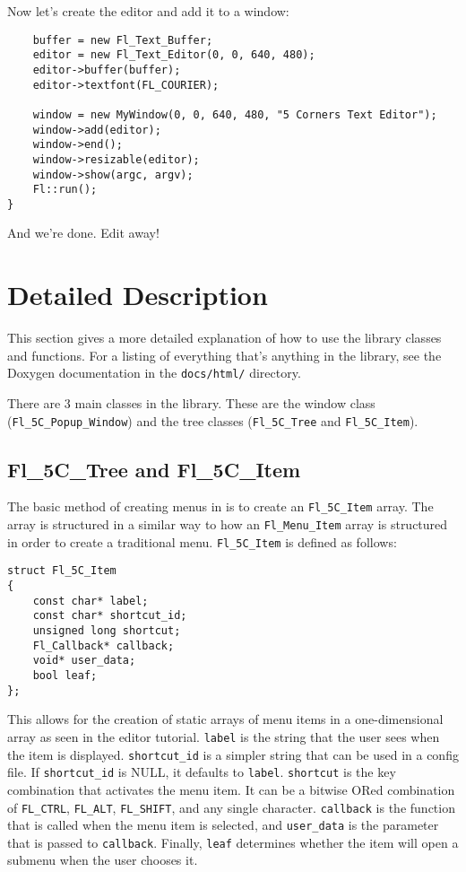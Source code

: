 Now let's create the editor and add it to a window:

\begin{samepage}
\begin{verbatim}
    buffer = new Fl_Text_Buffer;
    editor = new Fl_Text_Editor(0, 0, 640, 480);
    editor->buffer(buffer);
    editor->textfont(FL_COURIER);

    window = new MyWindow(0, 0, 640, 480, "5 Corners Text Editor");
    window->add(editor);
    window->end();
    window->resizable(editor);
    window->show(argc, argv);
    Fl::run();
}
\end{verbatim}
\end{samepage}

And we're done.  Edit away!

\section{Detailed Description}

This section gives a more detailed explanation of how to use the \fc{} library
classes and functions.  For a listing of everything that's anything in the
library, see the Doxygen documentation in the \texttt{docs/html/} directory.

There are 3 main classes in the library.  These are the window class
(\texttt{Fl\_5C\_Popup\_Window}) and the tree classes (\texttt{Fl\_5C\_Tree}
and \texttt{Fl\_5C\_Item}).

\subsection{Fl\_5C\_Tree and Fl\_5C\_Item}

The basic method of creating menus in \fc{} is to create an
\texttt{Fl\_5C\_Item} array.  The array is structured in a similar way to how
an \texttt{Fl\_Menu\_Item} array is structured in order to create a
traditional menu.  \texttt{Fl\_5C\_Item} is defined as follows:

\begin{samepage}
\begin{verbatim}
struct Fl_5C_Item
{
    const char* label;
    const char* shortcut_id;
    unsigned long shortcut;
    Fl_Callback* callback;
    void* user_data;
    bool leaf;
};
\end{verbatim}
\end{samepage}

This allows for the creation of static arrays of menu items in a
one-dimensional array as seen in the editor tutorial.  \texttt{label} is the
string that the user sees when the item is displayed.  \texttt{shortcut\_id}
is a simpler string that can be used in a config file.  If
\texttt{shortcut\_id} is NULL, it defaults to \texttt{label}.
\texttt{shortcut} is the key combination that activates the menu item.  It can
be a bitwise ORed combination of \texttt{FL\_CTRL}, \texttt{FL\_ALT},
\texttt{FL\_SHIFT}, and any single character.  \texttt{callback} is the
function that is called when the menu item is selected, and
\texttt{user\_data} is the parameter that is passed to \texttt{callback}.
Finally, \texttt{leaf} determines whether the item will open a submenu when
the user chooses it.

